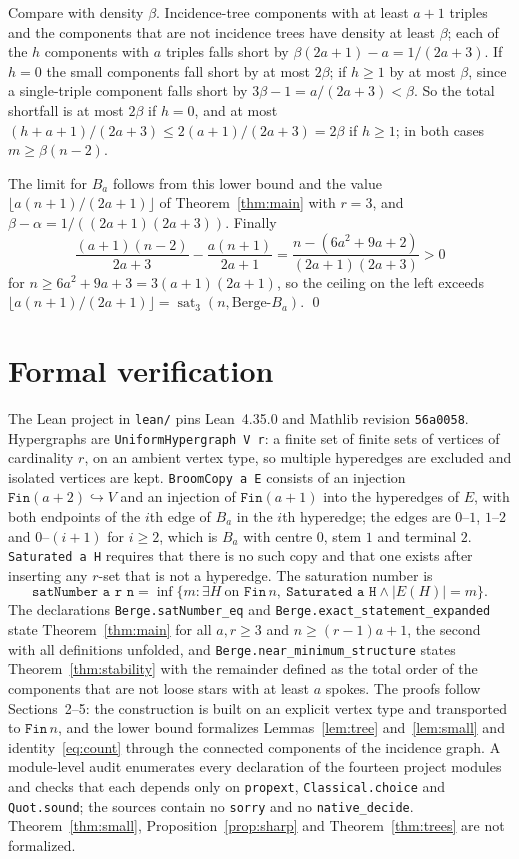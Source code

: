 \documentclass[11pt]{article}
\theoremstyle{definition}
\theoremstyle{remark}
\newcommand{\sat}{\operatorname{sat}}
\newcommand{\BB}{\text{Berge-}B_a}
\begin{document}
Compare with density $\beta$. Incidence-tree components with at least $a+1$
triples and the components that are not incidence trees have density at
least $\beta$; each of the $h$ components with $a$ triples falls short by
$\beta(2a+1)-a=1/(2a+3)$. If $h=0$ the small components fall short by at
most $2\beta$; if $h\ge1$ by at most $\beta$, since a single-triple
component falls short by $3\beta-1=a/(2a+3)<\beta$. So the total shortfall
is at most $2\beta$ if $h=0$, and at most $(h+a+1)/(2a+3)\le2(a+1)/(2a+3)
=2\beta$ if $h\ge1$; in both cases $m\ge\beta(n-2)$.

The limit for $B_a$ follows from this lower bound and the value
$\lfloor a(n+1)/(2a+1)\rfloor$ of Theorem~\ref{thm:main} with $r=3$, and
$\beta-\alpha=1/((2a+1)(2a+3))$. Finally
\[
\frac{(a+1)(n-2)}{2a+3}-\frac{a(n+1)}{2a+1}=\frac{n-(6a^2+9a+2)}{(2a+1)(2a+3)}>0
\]
for $n\ge6a^2+9a+3=3(a+1)(2a+1)$, so the ceiling on the left exceeds
$\lfloor a(n+1)/(2a+1)\rfloor=\sat_3(n,\BB)$. \qed

\section{Formal verification}\label{sec:lean}

The Lean project in \texttt{lean/} pins Lean~4.35.0 and Mathlib revision
\texttt{56a0058}. Hypergraphs are \texttt{UniformHypergraph V r}: a finite set
of finite sets of vertices of cardinality $r$, on an ambient vertex type, so
multiple hyperedges are excluded and isolated vertices are kept.
\texttt{BroomCopy a E} consists of an injection
$\mathtt{Fin}(a+2)\hookrightarrow V$ and an injection of $\mathtt{Fin}(a+1)$
into the hyperedges of $E$, with both endpoints of the $i$th edge of $B_a$ in
the $i$th hyperedge; the edges are $0$--$1$, $1$--$2$ and $0$--$(i+1)$ for
$i\ge2$, which is $B_a$ with centre $0$, stem $1$ and terminal $2$.
\texttt{Saturated a H} requires that there is no such copy and that one
exists after inserting any $r$-set that is not a hyperedge. The saturation
number is
\[
\texttt{satNumber a r n}=\inf\{m:\exists H\ \text{on }\mathtt{Fin}\,n,\
\texttt{Saturated a H}\wedge|E(H)|=m\}.
\]
The declarations \texttt{Berge.satNumber\_eq} and
\texttt{Berge.exact\_statement\_expanded} state Theorem~\ref{thm:main} for
all $a,r\ge3$ and $n\ge(r-1)a+1$, the second with all definitions unfolded,
and \texttt{Berge.near\_minimum\_structure} states
Theorem~\ref{thm:stability} with the remainder defined as the total order of
the components that are not loose stars with at least $a$ spokes. The proofs
follow Sections~2--5: the construction is built on an explicit vertex type
and transported to $\mathtt{Fin}\,n$, and the lower bound formalizes
Lemmas~\ref{lem:tree} and~\ref{lem:small} and identity~\eqref{eq:count}
through the connected components of the incidence graph. A module-level
audit enumerates every declaration of the fourteen project modules and
checks that each depends only on \texttt{propext}, \texttt{Classical.choice}
and \texttt{Quot.sound}; the sources contain no \texttt{sorry} and no
\texttt{native\_decide}. Theorem~\ref{thm:small},
Proposition~\ref{prop:sharp} and Theorem~\ref{thm:trees} are not formalized.
\end{document}
